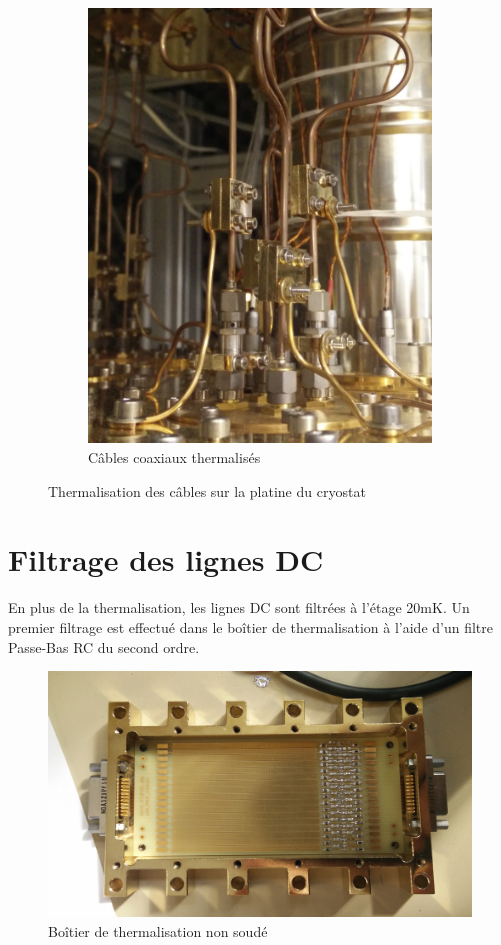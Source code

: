 \begin{figure}
\begin{subfigure}[t]{0.48\textwidth}
        \includegraphics[height=1.2\textwidth]{Images/Thermalisation/Coax}
        \caption{Câbles coaxiaux thermalisés}
    \end{subfigure}
    \caption{Thermalisation des câbles sur la platine du cryostat}
\end{figure}

\newpage
\section{Filtrage des lignes DC}
En plus de la thermalisation, les lignes DC sont filtrées à l'étage 20mK. Un premier filtrage est effectué dans le boîtier de thermalisation à l'aide d'un filtre Passe-Bas RC du second ordre.

\begin{figure}[h]
    \begin{center}
        \includegraphics[height=0.4\textwidth]{Images/Thermalisation/DC3}
        \caption{Boîtier de thermalisation non soudé}
        \label{DC_Filtrage}
    \end{center}
\end{figure}

